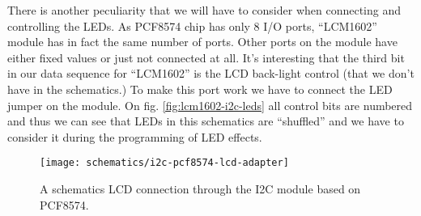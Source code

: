 \documentclass[../sparc.tex]{subfiles}
\begin{document}
There is another peculiarity that we will have to consider when connecting and
controlling the LEDs.  As PCF8574 chip has only 8 I/O ports, ``LCM1602'' module
has in fact the same number of ports.  Other ports on the module have either
fixed values or just not connected at all.  It's interesting that the third bit
in our data sequence for ``LCM1602'' is the LCD back-light control (that we
don't have in the schematics.)  To make this port work we have to connect the
LED jumper on the module.  On fig. \ref{fig:lcm1602-i2c-leds} all control bits
are numbered and thus we can see that LEDs in this schematics are ``shuffled''
and we have to consider it during the programming of LED effects.

\begin{figure}[H]
  \centering
  \texttt{[image: schematics/i2c-pcf8574-lcd-adapter]}
  \caption{A schematics LCD connection through the I2C module based on PCF8574.}
  \label{fig:i2c-pcf8574-lcd-adapter-schematics}
\end{figure}
\end{document}

